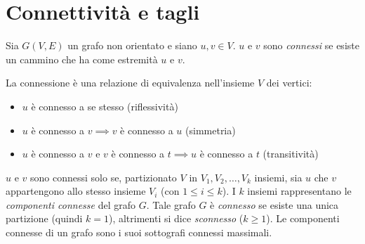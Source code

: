 \section{Connettività e tagli}
\begin{defn} Sia $G(V,E)$ un grafo non orientato 
e siano $u,v \in V$. $u$ e $v$ sono \emph{connessi} se esiste 
un cammino che ha come estremità $u$ e $v$.
\end{defn}
La connessione è una relazione di equivalenza nell'insieme $V$ dei vertici:
\begin{itemize}
    \item{$u$ è connesso a se stesso (riflessività)}
    \item{$u$ è connesso a $v \implies v$ è connesso a $u$ (simmetria)}
    \item{$u$ è connesso a $v$ e $v$ è connesso a $t \implies u$ è connesso a $t$ (transitività)}
\end{itemize}
$u$ e $v$ sono connessi solo se, partizionato $V$ in $V_1, V_2, \dots, V_k$ insiemi, sia $u$
che $v$ appartengono allo stesso insieme $V_i$ (con $1 \leqslant i \leqslant k$).
I $k$ insiemi rappresentano le \emph{componenti connesse} del grafo $G$. Tale grafo
$G$ è \emph{connesso} se esiste una unica partizione (quindi $k = 1$), altrimenti si dice
\emph{sconnesso} ($k \geqslant 1$). Le componenti connesse di un grafo sono i suoi sottografi
connessi massimali.

